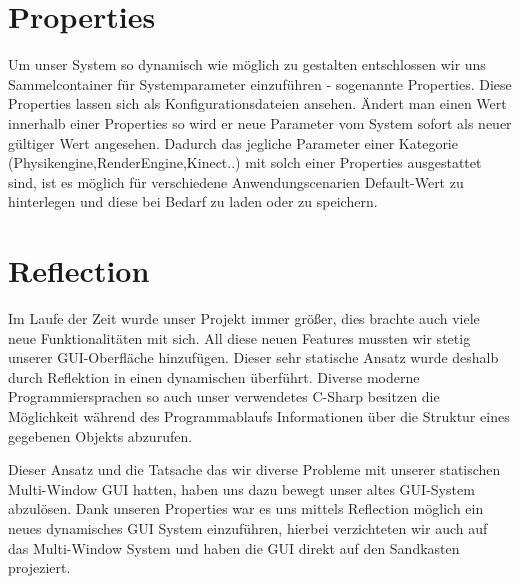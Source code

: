 \section{Properties}
Um unser System so dynamisch wie möglich zu gestalten entschlossen wir uns Sammelcontainer für Systemparameter einzuführen - sogenannte Properties.
Diese Properties lassen sich als Konfigurationsdateien ansehen. Ändert man einen Wert innerhalb einer Properties so wird er neue Parameter vom System sofort als neuer gültiger Wert angesehen.
Dadurch das jegliche Parameter einer Kategorie (Physikengine,RenderEngine,Kinect..) mit solch einer Properties ausgestattet sind, ist es möglich für verschiedene Anwendungscenarien Default-Wert zu hinterlegen und diese bei Bedarf zu laden oder zu speichern.

\section{Reflection}
Im Laufe der Zeit wurde unser Projekt immer größer, dies brachte auch viele neue Funktionalitäten mit sich.
All diese neuen Features mussten wir stetig unserer GUI-Oberfläche hinzufügen. Dieser sehr statische Ansatz wurde deshalb durch Reflektion in einen dynamischen überführt.
Diverse moderne Programmiersprachen so auch unser verwendetes C-Sharp besitzen die Möglichkeit während des Programmablaufs Informationen über die Struktur eines gegebenen Objekts abzurufen.



Dieser Ansatz und die Tatsache das wir diverse Probleme mit unserer statischen Multi-Window GUI hatten, haben uns dazu bewegt unser altes GUI-System abzulösen.
Dank unseren Properties war es uns mittels Reflection möglich ein neues dynamisches GUI System einzuführen, hierbei verzichteten wir auch auf das Multi-Window System und haben die GUI direkt auf den Sandkasten projeziert.


\clearpage
